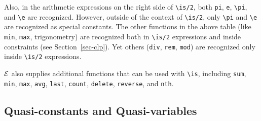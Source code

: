 \documentclass[11pt]{article}
\newcommand{\ERGO}{\mbox{\ensuremath{\cal{E}}\smaller{{\sc{RGO}}}}\xspace}
\newcommand{\bs}{\textbackslash}
\begin{document}
Also, in the arithmetic expressions on the right side of
\texttt{\bs{}is/2},
both \texttt{pi}, \texttt{e},
\texttt{\bs{}pi}, and \texttt{\bs{}e} are recognized. However, outside of
the context of \texttt{\bs{}is/2}, only \texttt{\bs{}pi} and
\texttt{\bs{}e} are recognized as special constants. The other functions in
the above table (like \texttt{min}, \texttt{max}, trigonometry) are
recognized both in \texttt{\bs{}is/2} expressions and inside constraints
(see Section~\ref{sec-clp}). Yet others (\texttt{div}, \texttt{rem},
\texttt{mod}) are recognized only inside \texttt{\bs{}is/2} expressions.   

\ERGO also supplies additional functions that can be used with \texttt{\bs{}is}, including
\texttt{sum}, \texttt{min}, \texttt{max}, \texttt{avg}, \texttt{last},
\texttt{count}, \texttt{delete}, \texttt{reverse},  
and \texttt{nth}.




\subsection{Quasi-constants and Quasi-variables}\label{sec-quasi-constants}
\end{document}
